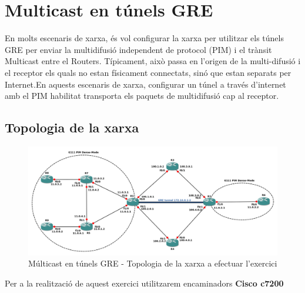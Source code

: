 \documentclass[10pt]{article}
\begin{document}
\section{Multicast en túnels GRE}
En molts escenaris de xarxa, és vol configurar la xarxa per utilitzar els túnels GRE per enviar la multidifusió independent de protocol (PIM) i el trànsit Multicast entre el Routers. Típicament, això passa en l'origen de la multi-difusió i el receptor els quals no estan físicament connectats, sinó que estan separats per Internet.En aquests escenaris de xarxa, configurar un túnel a través d'internet amb el PIM habilitat transporta els paquets de multidifusió cap al receptor.
\subsection{Topologia de la xarxa}
\begin{figure}[H]
\begin{center}
\includegraphics[scale=0.4]{Images/topology3.png}
\caption{Múlticast en túnels GRE - Topologia de la xarxa a efectuar l'exercici}
\end{center}
\end{figure}
Per a la realització de aquest exercici utilitzarem encaminadors \textbf{Cisco c7200}
\end{document}
